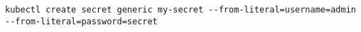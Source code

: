 \begin{verbatim}
kubectl create secret generic my-secret --from-literal=username=admin --from-literal=password=secret
\end{verbatim}